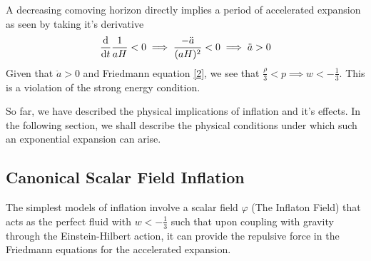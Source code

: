 \documentclass[aps,prd,reprint,preprintnumbers,showpacs,floatfix,nofootinbib,superscript address]{revtex4-2}
\begin{document}
A decreasing comoving horizon directly implies a period of accelerated expansion as seen by taking it's derivative
\begin{equation}
    \frac{\mathrm{d}}{\mathrm{d}t} \frac{1}{aH} <  0 \implies \frac{-\Ddot{a}}{(aH)^2} < 0 \implies \ddot{a} > 0
\end{equation}
Given that $\ddot{a} > 0$ and Friedmann equation \ref{2}, we see that $\frac{\rho}{3} < p \implies w < - \frac{1}{3}$. This is a violation of the strong energy condition.

So far, we have described the physical implications of inflation and it's effects. In the following section, we shall describe the physical conditions under which such an exponential expansion can arise. 

\subsection{Canonical Scalar Field Inflation} \label{Canonical Scalar Field Inflation}
The simplest models of inflation involve a scalar field $\varphi$ (The Inflaton Field) that acts as the perfect fluid with $w < -\frac{1}{3}$ such that upon coupling with gravity through the Einstein-Hilbert action, it can provide the repulsive force in the Friedmann equations for the accelerated expansion.
\end{document}
